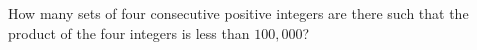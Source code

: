 How many sets of four consecutive positive integers are there such that the product of the four integers is less than $100{,}000$?
